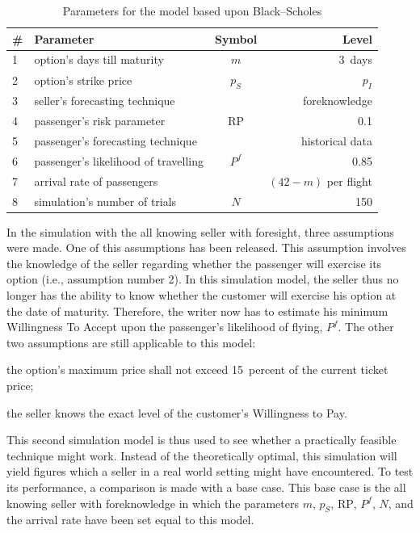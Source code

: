\begin{table}
\begin{center}
\begin{tabular}{l l c r}
    \toprule
    \#  & Parameter  &  Symbol  &  Level \\
    \midrule
    1  &  option's days till maturity  &  $m$  & 3~days \\
    2  &  option's strike price  &  $p_S$  &  $p_I$  \\
    3  &  seller's forecasting technique  &  ~  & foreknowledge \\
    4  &  passenger's risk parameter  &  $\mbox{RP}$  &  0.1 \\ 
    5  &  passenger's forecasting technique  &  ~  &  historical data \\
    6  &  passenger's likelihood of travelling  &  $P^f$  &  0.85 \\
    7  &  arrival rate of passengers  &  ~  &  $(42 - m)$ per flight \\
    8  &  simulation's number of trials  &  $N$  &  150 \\
    \bottomrule
\end{tabular}
\caption{Parameters for the model based upon Black--Scholes}
\label{tbl:ParameterConfigBlackScholes}
\end{center}
\end{table}


In the simulation with the all knowing seller with foresight, three assumptions were made. One of this assumptions has been released. This assumption involves the knowledge of the seller regarding whether the passenger will exercise its option (i.e., assumption number 2). In this simulation model, the seller thus no longer has the ability to know whether the customer will exercise his option at the date of maturity. Therefore, the writer now has to estimate his minimum Willingness To Accept upon the passenger's likelihood of flying, $P^f$. The other two assumptions are still applicable to this model:
\begin{compactenum}
\item the option's maximum price shall not exceed 15~percent of the current ticket price;
\item the seller knows the exact level of the customer's Willingness to Pay.
\end{compactenum}

This second simulation model is thus used to see whether a practically feasible technique might work. Instead of the theoretically optimal, this simulation will yield figures which a seller in a real world setting might have encountered. To test its performance, a comparison is made with a base case. This base case is the all knowing seller with foreknowledge in which the parameters $m$, $p_S$, $\mbox{RP}$, $P^f$, $N$, and the arrival rate have been set equal to this model.


